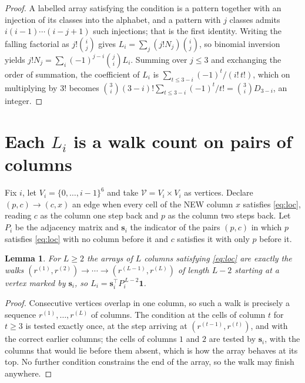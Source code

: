 \documentclass[11pt,a4paper]{article}
\theoremstyle{plain}
\newtheorem{lemma}[theorem]{Lemma}
\theoremstyle{definition}
\begin{document}
\begin{proof}
A labelled array satisfying the condition is a pattern together with an injection of its
classes into the alphabet, and a pattern with $j$ classes admits $i(i-1)\cdots(i-j+1)$ such
injections; that is the first identity. Writing the falling factorial as $j!\binom{i}{j}$
gives $L_i=\sum_j(j!N_j)\binom{i}{j}$, so binomial inversion yields
$j!N_j=\sum_i(-1)^{j-i}\binom{j}{i}L_i$. Summing over $j\le3$ and exchanging the
order of summation, the coefficient of $L_i$ is $\sum_{t\le3-i}(-1)^t/(i!\,t!)$, which on
multiplying by $3!$ becomes
$\binom{3}{i}(3-i)!\sum_{t\le3-i}(-1)^t/t!=\binom{3}{i}D_{3-i}$, an
integer.
\end{proof}

\section{Each $L_i$ is a walk count on pairs of columns}

Fix $i$, let $V_i=\{0,\dots,i-1\}^{6}$ and take $\mathcal V=V_i\times V_i$ as vertices.
Declare $(p,c)\to(c,x)$ an edge when every cell of the NEW column $x$ satisfies
\eqref{eq:loc}, reading $c$ as the column one step back and $p$ as the column two steps
back. Let $P_i$ be the adjacency matrix and $\mathbf{s}_i$ the indicator of the pairs
$(p,c)$ in which $p$ satisfies \eqref{eq:loc} with no column before it and $c$ satisfies it
with only $p$ before it.

\begin{lemma}\label{lem:walk}
For $L\ge2$ the arrays of $L$ columns satisfying \eqref{eq:loc} are exactly the walks
$(r^{(1)},r^{(2)})\to\cdots\to(r^{(L-1)},r^{(L)})$ of length $L-2$ starting at a
vertex marked by $\mathbf{s}_i$, so
$L_i=\mathbf{s}_i^{\!\top}P_i^{\,L-2}\mathbf{1}$.
\end{lemma}

\begin{proof}
Consecutive vertices overlap in one column, so such a walk is precisely a sequence
$r^{(1)},\dots,r^{(L)}$ of columns. The condition at the cells of column $t$ for $t\ge3$
is tested exactly once, at the step arriving at $(r^{(t-1)},r^{(t)})$, and with the
correct earlier columns; the cells of columns $1$ and $2$ are tested by $\mathbf{s}_i$, with
the columns that would lie before them absent, which is how the array behaves at its top. No
further condition constrains the end of the array, so the walk may finish anywhere.
\end{proof}
\end{document}
